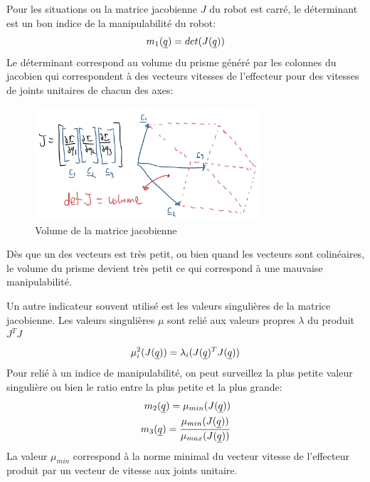 Pour les situations ou la matrice jacobienne $J$ du robot est carré, le déterminant est un bon indice de la manipulabilité du robot:
\begin{align}
m_1(\underline{q})= det( J(\underline{q}) )
\end{align} 
Le déterminant correspond au volume du prisme généré par les colonnes du jacobien qui correspondent à des vecteurs vitesses de l'effecteur pour des vitesses de joints unitaires de chacun des axes:
\begin{figure}[H]
	\centering
		\includegraphics[width=0.75\textwidth]{fig/jacobianvolume.jpg}
	\caption{Volume de la matrice jacobienne}
	\label{fig:jacobianvolume}
\end{figure}
Dès que un des vecteurs est très petit, ou bien quand les vecteurs sont colinéaires, le volume du prisme devient très petit ce qui correspond à une mauvaise manipulabilité.


Un autre indicateur souvent utilisé est les valeurs singulières de la matrice jacobienne. Les valeurs singulières $\mu$ sont relié aux valeurs propres $\lambda$ du produit $J^TJ$
\begin{align}
\mu^2_{i}( J(\underline{q}) ) = \lambda_i( J(\underline{q})^T J(\underline{q}) )
\end{align} 
Pour relié à un indice de manipulabilité, on peut surveillez la plus petite valeur singulière ou bien le ratio entre la plus petite et la plus grande:
\begin{align}
m_2(\underline{q})= \mu_{min}( J(\underline{q}) ) \\
m_3(\underline{q})= \frac{\mu_{min}( J(\underline{q}) ) }{\mu_{max}( J(\underline{q}) ) }\\
\end{align} 
La valeur $\mu_{min}$ correspond à la norme minimal du vecteur vitesse de l'effecteur produit par un vecteur de vitesse aux joints unitaire.


